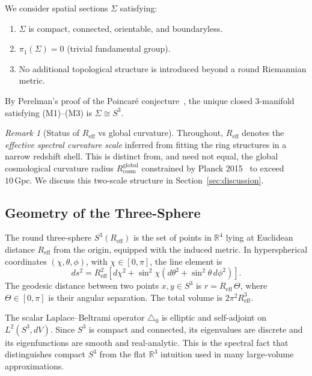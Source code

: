 \documentclass[
  aps,
  prd,
  reprint,
  superscriptaddress,
  nofootinbib,
  longbibliography,
  floatfix,
  amsmath,
  amssymb
]{revtex4-2}
\theoremstyle{plain}
\theoremstyle{definition}
\theoremstyle{remark}
\newtheorem{remark}[theorem]{Remark}
\newcommand{\Sthree}{S^3}
\newcommand{\Reff}{R_{\mathrm{eff}}}
\newcommand{\Rcosm}{R_{\mathrm{cosm}}}
\begin{document}
We consider spatial sections $\Sigma$ satisfying:
\begin{enumerate}[label=\textbf{(M\arabic*)},noitemsep]
\item $\Sigma$ is compact, connected, orientable, and boundaryless.
\item $\pi_1(\Sigma)=0$ (trivial fundamental group).
\item No additional topological structure is introduced beyond a round
  Riemannian metric.
\end{enumerate}
By Perelman's proof of the Poincar\'e
conjecture~\cite{Perelman2002,Perelman2003a,Perelman2003b}, the unique
closed 3-manifold satisfying (M1)--(M3) is $\Sigma\cong\Sthree$.

\begin{remark}[Status of $\Reff$ vs global curvature]
  Throughout, $\Reff$ denotes the \emph{effective spectral curvature
  scale} inferred from fitting the ring structures in a narrow redshift
  shell. This is distinct from, and need not equal, the global
  cosmological curvature radius $\Rcosm^{\mathrm{global}}$ constrained
  by Planck 2015~\cite{Planck2016} to exceed $10\,\mathrm{Gpc}$.
  We discuss this two-scale structure in Section~\ref{sec:discussion}.
\end{remark}

\subsection{Geometry of the Three-Sphere}

The round three-sphere $\Sthree(\Reff)$ is the set of points in
$\mathbb{R}^4$ lying at Euclidean distance $\Reff$ from the origin,
equipped with the induced metric. In hyperspherical coordinates
$(\chi,\theta,\phi)$, with $\chi\in[0,\pi]$, the line element is
\begin{equation}
  ds^2 = \Reff^2\left[d\chi^2+
  \sin^2\chi\left(d\theta^2+\sin^2\theta\,d\phi^2\right)\right].
  \label{eq:S3metric}
\end{equation}
The geodesic distance between two points $x,y\in \Sthree$ is
$r=\Reff\,\Theta$, where $\Theta\in[0,\pi]$ is their angular separation.
The total volume is $2\pi^2\Reff^3$.

The scalar Laplace--Beltrami operator $\triangle_0$ is elliptic and
self-adjoint on $L^2(\Sthree,dV)$. Since $\Sthree$ is compact and
connected, its eigenvalues are discrete and its eigenfunctions are
smooth and real-analytic. This is the spectral fact that distinguishes
compact $\Sthree$ from the flat $\mathbb{R}^3$ intuition used in many
large-volume approximations.
\end{document}
